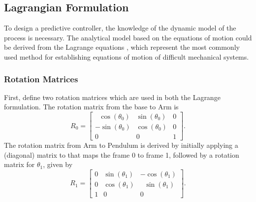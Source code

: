 \subsection{Lagrangian Formulation}
To design a predictive controller, the knowledge of the dynamic model of the process is necessary. The analytical model based on the equations of motion could be derived from the Lagrange equations \cite{furuta:model}, which represent the most commonly used method for establishing equations of motion of difficult mechanical systems.
\subsubsection{Rotation Matrices}
First, define two rotation matrices
which are used in both the Lagrange formulation. The rotation matrix from the base to Arm is
\begin{equation}
	R_0 = 	\begin{bmatrix}
					\ \ \,\cos(\theta_0) & \sin(\theta_0) & 0\\
					-\sin(\theta_0) & \cos(\theta_0) & 0\\
					0 & 0 & 1
				\end{bmatrix}.
\end{equation}
The rotation matrix from Arm to Pendulum is derived by
initially applying a (diagonal) matrix to that maps the frame
0 to frame 1, followed by a rotation matrix for $\theta_1$, given by
\begin{equation}
R_1 = 	\begin{bmatrix}
			0 & \sin(\theta_1) & -\cos(\theta_1)\\
			0 & \cos(\theta_1) & \ \ \,\sin(\theta_1)\\
			1 & 0 & 0                      
		\end{bmatrix}.
\end{equation}
